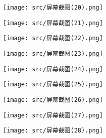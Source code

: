 \documentclass{article}
\begin{document}
\begin{center}
    \texttt{[image: src/屏幕截图(20).png]}
\end{center}


\begin{center}
    \texttt{[image: src/屏幕截图(21).png]}
\end{center}


\begin{center}
    \texttt{[image: src/屏幕截图(22).png]}
\end{center}


\begin{center}
    \texttt{[image: src/屏幕截图(23).png]}
\end{center}


\begin{center}
    \texttt{[image: src/屏幕截图(24).png]}
\end{center}


\begin{center}
    \texttt{[image: src/屏幕截图(25).png]}
\end{center}

\begin{center}
    \texttt{[image: src/屏幕截图(26).png]}
\end{center}


\begin{center}
    \texttt{[image: src/屏幕截图(27).png]}
\end{center}


\begin{center}
    \texttt{[image: src/屏幕截图(28).png]}
\end{center}
\end{document}

